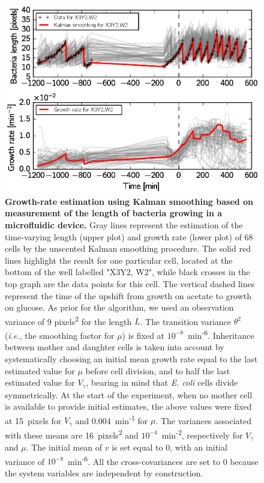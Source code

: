 \begin{figure}[p]
\centering
\includegraphics[scale=1]{./Fig/growth_rate_estimation}
\caption{
\textbf{Growth-rate estimation using Kalman smoothing based on measurement of the length of bacteria growing in a microfluidic device.}
Gray lines represent the estimation of the time-varying length (upper plot) and growth rate (lower plot) of 68 cells by the unscented Kalman smoothing procedure.
The solid red lines highlight the result for one particular cell, located at the bottom of the well labelled "X3Y2, W2", while black crosses in the top graph are the data points for this cell.
The vertical dashed lines represent the time of the upshift from growth on acetate to growth on glucose.
As prior for the algorithm, we used an observation variance of 9 pixels\textsuperscript{2} for the length $L$.
The transition variance $\theta^2$ (\textit{i.e.}, the smoothing factor for $\mu$) is fixed at $10^{-8}$~min\textsuperscript{-6}.
Inheritance between mother and daughter cells is taken into account by systematically choosing an initial mean growth rate equal to the last estimated value for $\mu$ before cell division, and to half the last estimated value for $V_\gamma$, bearing in mind that \textit{E. coli} cells divide symmetrically.
At the start of the experiment, when no mother cell is available to provide initial estimates, the above values were fixed at 15~pixels for $V_\gamma$ and 0.004~min\textsuperscript{-1} for $\mu$.
The variances associated with these means are 16~pixels\textsuperscript{2} and $10^{-4}$~min\textsuperscript{-2}, respectively for $V_\gamma$ and $\mu$.
The initial mean of $v$ is set equal to 0, with an initial variance of $10^{-8}$~min\textsuperscript{-6}.
All the cross-covariances are set to 0 because the system variables are independent by construction.
}
\label{fig:growth_rate_estimation}
\end{figure}

